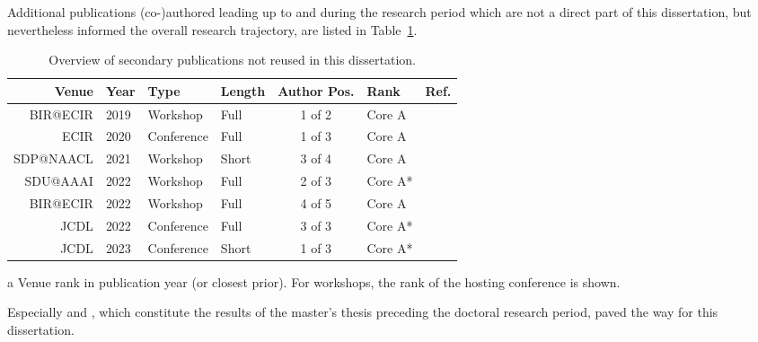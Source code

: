 Additional publications (co-)authored leading up to and during the research period which are not a direct part of this dissertation, but nevertheless informed the overall research trajectory, are listed in Table~\ref{tab:secondarypublicationoverview}.

\begin{table}[h]
  \caption{Overview of secondary publications not reused in this dissertation.}
  \label{tab:secondarypublicationoverview}
  \centering
  \begin{threeparttable}
  \begin{tabular}{rlllclr}
    \hline
    Venue & Year & Type & Length & Author Pos. & Rank\tnote{a} & Ref. \\
    \hline
    BIR@ECIR & 2019 & Workshop & Full & 1 of 2 & Core A & \cite{Saier2019} \\
    ECIR & 2020 & Conference & Full & 1 of 3 & Core A & \cite{Saier2020a} \\
    SDP@NAACL & 2021 & Workshop & Short & 3 of 4 & Core A & \cite{Krause2021} \\
    SDU@AAAI & 2022 & Workshop & Full & 2 of 3 & Core A* & \cite{Shapiro2022} \\
    BIR@ECIR & 2022 & Workshop & Full & 4 of 5 & Core A & \cite{Faerber2022bir} \\
    JCDL & 2022 & Conference & Full & 3 of 3 & Core A* & \cite{Nishioka2022} \\
    JCDL & 2023 & Conference & Short & 1 of 3 & Core A* & \cite{Saier2023cocon} \\
    \hline
    \end{tabular}
    \begin{tablenotes}
      \item[a] Venue rank in publication year (or closest prior). For workshops, the rank of the hosting conference is shown.
    \end{tablenotes}
    \end{threeparttable}
\end{table}

Especially \cite{Saier2019} and \cite{Saier2020a}, which constitute the results of the master's thesis preceding the doctoral research period, paved the way for this dissertation.
